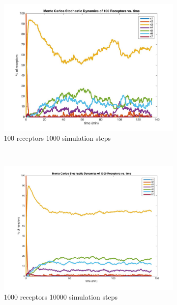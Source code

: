 \documentclass[fleqn,10pt]{wlscirep}
\begin{document}
\begin{figure}
    \centering
    \begin{subfigure}[b]{0.3\textwidth}
        \includegraphics[width=\textwidth]{MC_100_1000}
        \caption{100 receptors 1000 simulation steps}
        \label{fig:MC_100_1000}
    \end{subfigure}
    ~ 
    \begin{subfigure}[b]{0.3\textwidth}
        \includegraphics[width=\textwidth]{MC_1000_10000}
        \caption{1000 receptors 10000 simulation steps}
        \label{fig:MC_1000_10000}
    \end{subfigure}
    ~ 
    \begin{subfigure}[b]{0.3\textwidth}

\end{subfigure}
\end{figure}
\end{document}
